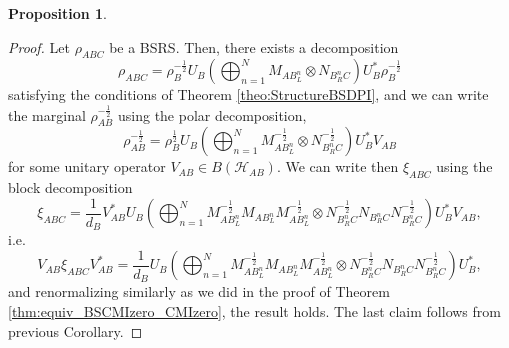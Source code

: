 \documentclass[11pt]{article}
\theoremstyle{newdefinition}
\theoremstyle{newplain}
\newtheorem{proposition}[definition]{Proposition}
\theoremstyle{myplain}
\DeclareMathOperator{\1}{\mathds{1}}
\begin{document}
{\begin{proposition}
\end{proposition}
\begin{proof}
    Let $\rho_{ABC}$ be a BSRS. Then, there exists a decomposition
    \begin{equation}
        \rho_{ABC}=\rho_B^{-\frac{1}{2}}U_B \left( \bigoplus_{n=1}^N M_{AB_L^n}\otimes N_{B_R^nC} \right)U_B^* \rho_B^{-\frac{1}{2}}
    \end{equation}
satisfying the conditions of Theorem \ref{theo:StructureBSDPI}, and we can write the marginal $\rho_{AB}^{-\frac{1}{2}}$ using the polar decomposition,
\begin{equation}
    \rho_{AB}^{-\frac{1}{2}}=\rho_B^{\frac{1}{2}}U_B\left( \bigoplus_{n=1}^N M_{AB_L^n}^{-\frac{1}{2}}\otimes N_{B_R^nC}^{-\frac{1}{2}} \right)U_B^*V_{AB}
\end{equation}
for some unitary operator $V_{AB} \in B(\mathcal{H}_{AB})$. We can write then $\xi_{ABC}$ using the block decomposition 
\begin{equation}
    \xi_{ABC}=\frac{1}{d_B}V_{AB}^*U_B\left( \bigoplus_{n=1}^N M_{AB_L^n}^{-\frac{1}{2}}M_{AB_L^n}M_{AB_L^n}^{-\frac{1}{2}}\otimes N_{B_R^nC}^{-\frac{1}{2}}N_{B_R^nC} N_{B_R^nC}^{-\frac{1}{2}}\right)U_B^*V_{AB},
\end{equation}
i.e.
\begin{equation}
    V_{AB}\xi_{ABC}V_{AB}^*=\frac{1}{d_B}U_B\left( \bigoplus_{n=1}^N M_{AB_L^n}^{-\frac{1}{2}}M_{AB_L^n}M_{AB_L^n}^{-\frac{1}{2}}\otimes N_{B_R^nC}^{-\frac{1}{2}}N_{B_R^nC} N_{B_R^nC}^{-\frac{1}{2}}\right)U_B^*,
\end{equation}
and renormalizing similarly as we did in the proof of Theorem \ref{thm:equiv_BSCMIzero_CMIzero}, the result holds. The last claim follows from previous Corollary.
\end{proof}
}
\end{document}
